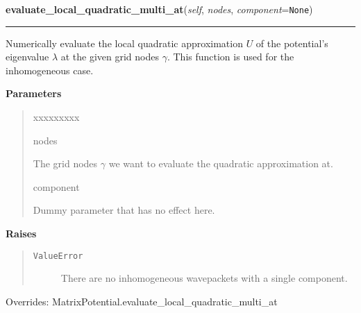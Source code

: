 \hspace{.8\funcindent}\begin{boxedminipage}{\funcwidth}

    \raggedright \textbf{evaluate\_local\_quadratic\_multi\_at}(\textit{self}, \textit{nodes}, \textit{component}={\tt None})

    \vspace{-1.5ex}

    \rule{\textwidth}{0.5\fboxrule}
\setlength{\parskip}{2ex}
    Numerically evaluate the local quadratic approximation $U$ of the
    potential's eigenvalue $\lambda$ at the given grid
    nodes $\gamma$. This function is used for the
    inhomogeneous case.

\setlength{\parskip}{1ex}
      \textbf{Parameters}
      \vspace{-1ex}

      \begin{quote}
        \begin{Ventry}{xxxxxxxxx}

          \item[nodes]

          The grid nodes $\gamma$ we want to evaluate the
          quadratic approximation at.

          \item[component]

          Dummy parameter that has no effect here.

        \end{Ventry}

      \end{quote}

      \textbf{Raises}
    \vspace{-1ex}

      \begin{quote}
        \begin{description}

          \item[\texttt{ValueError}]

          There are no inhomogeneous wavepackets with a single component.

        \end{description}

      \end{quote}

      Overrides: MatrixPotential.evaluate\_local\_quadratic\_multi\_at

    \end{boxedminipage}

